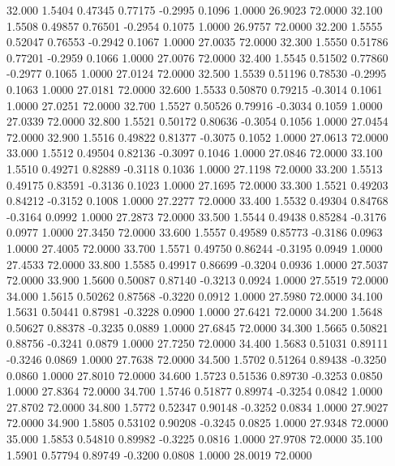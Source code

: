   32.000   1.5404   0.47345   0.77175  -0.2995   0.1096   1.0000  26.9023  72.0000
  32.100   1.5508   0.49857   0.76501  -0.2954   0.1075   1.0000  26.9757  72.0000
  32.200   1.5555   0.52047   0.76553  -0.2942   0.1067   1.0000  27.0035  72.0000
  32.300   1.5550   0.51786   0.77201  -0.2959   0.1066   1.0000  27.0076  72.0000
  32.400   1.5545   0.51502   0.77860  -0.2977   0.1065   1.0000  27.0124  72.0000
  32.500   1.5539   0.51196   0.78530  -0.2995   0.1063   1.0000  27.0181  72.0000
  32.600   1.5533   0.50870   0.79215  -0.3014   0.1061   1.0000  27.0251  72.0000
  32.700   1.5527   0.50526   0.79916  -0.3034   0.1059   1.0000  27.0339  72.0000
  32.800   1.5521   0.50172   0.80636  -0.3054   0.1056   1.0000  27.0454  72.0000
  32.900   1.5516   0.49822   0.81377  -0.3075   0.1052   1.0000  27.0613  72.0000
  33.000   1.5512   0.49504   0.82136  -0.3097   0.1046   1.0000  27.0846  72.0000
  33.100   1.5510   0.49271   0.82889  -0.3118   0.1036   1.0000  27.1198  72.0000
  33.200   1.5513   0.49175   0.83591  -0.3136   0.1023   1.0000  27.1695  72.0000
  33.300   1.5521   0.49203   0.84212  -0.3152   0.1008   1.0000  27.2277  72.0000
  33.400   1.5532   0.49304   0.84768  -0.3164   0.0992   1.0000  27.2873  72.0000
  33.500   1.5544   0.49438   0.85284  -0.3176   0.0977   1.0000  27.3450  72.0000
  33.600   1.5557   0.49589   0.85773  -0.3186   0.0963   1.0000  27.4005  72.0000
  33.700   1.5571   0.49750   0.86244  -0.3195   0.0949   1.0000  27.4533  72.0000
  33.800   1.5585   0.49917   0.86699  -0.3204   0.0936   1.0000  27.5037  72.0000
  33.900   1.5600   0.50087   0.87140  -0.3213   0.0924   1.0000  27.5519  72.0000
  34.000   1.5615   0.50262   0.87568  -0.3220   0.0912   1.0000  27.5980  72.0000
  34.100   1.5631   0.50441   0.87981  -0.3228   0.0900   1.0000  27.6421  72.0000
  34.200   1.5648   0.50627   0.88378  -0.3235   0.0889   1.0000  27.6845  72.0000
  34.300   1.5665   0.50821   0.88756  -0.3241   0.0879   1.0000  27.7250  72.0000
  34.400   1.5683   0.51031   0.89111  -0.3246   0.0869   1.0000  27.7638  72.0000
  34.500   1.5702   0.51264   0.89438  -0.3250   0.0860   1.0000  27.8010  72.0000
  34.600   1.5723   0.51536   0.89730  -0.3253   0.0850   1.0000  27.8364  72.0000
  34.700   1.5746   0.51877   0.89974  -0.3254   0.0842   1.0000  27.8702  72.0000
  34.800   1.5772   0.52347   0.90148  -0.3252   0.0834   1.0000  27.9027  72.0000
  34.900   1.5805   0.53102   0.90208  -0.3245   0.0825   1.0000  27.9348  72.0000
  35.000   1.5853   0.54810   0.89982  -0.3225   0.0816   1.0000  27.9708  72.0000
  35.100   1.5901   0.57794   0.89749  -0.3200   0.0808   1.0000  28.0019  72.0000
